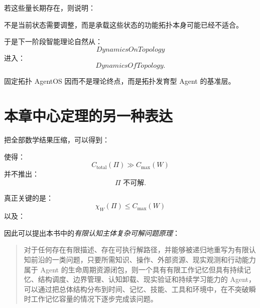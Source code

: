 若这些量长期存在，则说明：
\begin{statementbox}
不是当前状态需要调整，而是承载这些状态的功能拓扑本身可能已经不适合。
\end{statementbox}

于是下一阶段智能理论自然从：
\begin{equation}
DynamicsOnTopology
\end{equation}
进入：
\begin{equation}
DynamicsOfTopology.
\end{equation}

固定拓扑 AgentOS 因而不是理论终点，而是拓扑发育型 Agent 的基准层。

\section{本章中心定理的另一种表达}

把全部数学结果压缩，可以得到：

\begin{statementbox}
\centering
{}
\end{statementbox}

使得：
\begin{equation}
\boxed{
C_{\mathrm{total}}(\Pi)
\gg
C_{\max}(W)
}
\end{equation}
并不推出：
\begin{equation}
\Pi
\text{ 不可解}.
\end{equation}

真正关键的是：
\begin{equation}
\boxed{
\chi_W(\Pi)
\leq
C_{\max}(W)
}
\end{equation}
以及：
\begin{statementbox}
\centering
{}
\end{statementbox}

因此可以提出本书中的\emph{有限认知主体复杂可解问题原理}：

\begin{quote}
对于任何存在有限描述、存在可执行解路径，并能够被递归地重写为有限认知前沿的一类问题，只要所需知识、操作、外部资源、现实观测和行动能力属于 Agent 的生命周期资源闭包，则一个具有有限工作记忆但具有持续记忆、结构调度、边界管理、认知卸载、现实验证和持续学习能力的 Agent，可以通过把总体结构分布到时间、记忆、技能、工具和环境中，在不突破瞬时工作记忆容量的情况下逐步完成该问题。
\end{quote}

